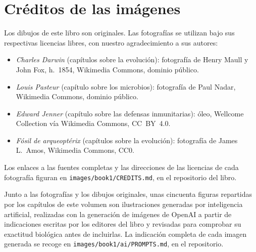 \chapter*{Créditos de las imágenes}

Los dibujos de este libro son originales. Las fotografías se utilizan
bajo sus respectivas licencias libres, con nuestro agradecimiento a
sus autores:

\begin{itemize}
  \item \emph{Charles Darwin} (capítulos sobre la evolución):
        fotografía de Henry Maull y John Fox, h.~1854, Wikimedia
        Commons, dominio público.
  \item \emph{Louis Pasteur} (capítulo sobre los microbios):
        fotografía de Paul Nadar, Wikimedia Commons, dominio público.
  \item \emph{Edward Jenner} (capítulo sobre las defensas inmunitarias):
        óleo, Wellcome Collection vía Wikimedia Commons, CC~BY~4.0.
  \item \emph{Fósil de arqueoptérix} (capítulos sobre la evolución):
        fotografía de James L.~Amos, Wikimedia Commons, CC0.
\end{itemize}

Los enlaces a las fuentes completas y las direcciones de las licencias
de cada fotografía figuran en \texttt{images/book1/CREDITS.md}, en el
repositorio del libro.

\bigskip
Junto a las fotografías y los dibujos originales, unas cincuenta
figuras repartidas por los capítulos de este volumen son ilustraciones
generadas por inteligencia artificial, realizadas con la generación de
imágenes de OpenAI a partir de indicaciones escritas por los editores
del libro y revisadas para comprobar su exactitud biológica antes de
incluirlas. La indicación completa de cada imagen generada se recoge en
\texttt{images/book1/ai/PROMPTS.md}, en el repositorio.
\clearpage
